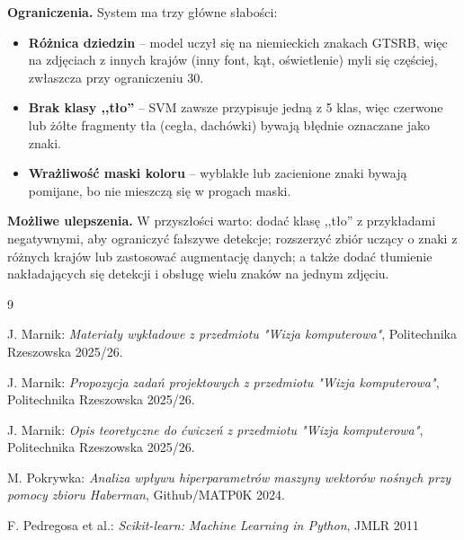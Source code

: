 \documentclass[12pt,oneside]{article}
\begin{document}
\textbf{Ograniczenia.} System ma trzy główne słabości:
\begin{itemize}
    \item \textbf{Różnica dziedzin} -- model uczył się na niemieckich znakach GTSRB,
          więc na zdjęciach z innych krajów (inny font, kąt, oświetlenie) myli się
          częściej, zwłaszcza przy ograniczeniu 30.
    \item \textbf{Brak klasy ,,tło''} -- SVM zawsze przypisuje jedną z 5 klas, więc
          czerwone lub żółte fragmenty tła (cegła, dachówki) bywają błędnie
          oznaczane jako znaki.
    \item \textbf{Wrażliwość maski koloru} -- wyblakłe lub zacienione znaki bywają
          pomijane, bo nie mieszczą się w progach maski.
\end{itemize}

\textbf{Możliwe ulepszenia.} W przyszłości warto: dodać klasę ,,tło'' z przykładami
negatywnymi, aby ograniczyć fałszywe detekcje; rozszerzyć zbiór uczący o znaki z
różnych krajów lub zastosować augmentację danych; a także dodać tłumienie
nakładających się detekcji i obsługę wielu znaków na jednym zdjęciu.

\begin{thebibliography}{9}

        J. Marnik:
        \textit{Materiały wykładowe z przedmiotu "Wizja komputerowa"},
        Politechnika Rzeszowska 2025/26.

        J. Marnik:
        \textit{Propozycja zadań projektowych z przedmiotu "Wizja komputerowa"},
        Politechnika Rzeszowska 2025/26.

        J. Marnik:
        \textit{Opis teoretyczne do ćwiczeń z przedmiotu "Wizja komputerowa"},
        Politechnika Rzeszowska 2025/26.

        M. Pokrywka:
        \textit{Analiza wpływu hiperparametrów maszyny wektorów nośnych przy pomocy zbioru Haberman},
        Github/MATP0K 2024.

    

        F. Pedregosa et al.:
        \textit{Scikit-learn: Machine Learning in Python},
        JMLR 2011

\end{thebibliography}
\end{document}
